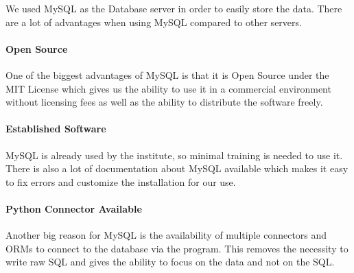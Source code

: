We used MySQL as the Database server in order to easily store the data.
There are a lot of advantages when using MySQL compared to other servers.

\paragraph{Open Source}
One of the biggest advantages of MySQL is that it is Open Source under the MIT License which gives us the ability to use it in a commercial environment without licensing fees as well as the ability to distribute the software freely.

\paragraph{Established Software}
MySQL is already used by the institute, so minimal training is needed to use it.
There is also a lot of documentation about MySQL available which makes it easy to fix errors and customize the installation for our use.

\paragraph{Python Connector Available}
Another big reason for MySQL is the availability of multiple connectors and ORMs to connect to the database via the program. This removes the necessity to write raw SQL and gives the ability to focus on the data and not on the SQL. 